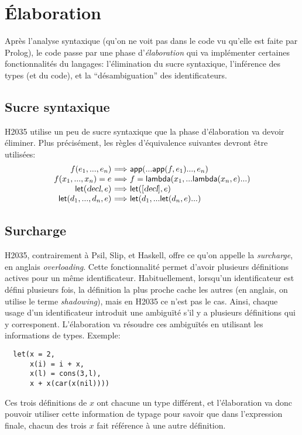 \documentclass{article}
\newcommand \kw [1] {\textsf{#1}}
\newcommand \id [1] {\textsl{#1}}
\renewcommand \: {\!:\!}
\begin{document}
\section{Élaboration}

Après l'analyse syntaxique (qu'on ne voit pas dans le code vu qu'elle est
faite par Prolog), le code passe par une phase d'\emph{élaboration} qui va
implémenter certaines fonctionnalités du langages: l'élimination du sucre
syntaxique, l'inférence des types (et du code), et la ``désambiguation''
des identificateurs.

\subsection{Sucre syntaxique}

H2035 utilise un peu de sucre syntaxique que la phase d'élaboration va
devoir éliminer.  Plus précisément, les règles d'équivalence suivantes
devront être utilisées:
\begin{displaymath}
  \begin{array}{r@{~\Longrightarrow~}l}
    f(e_1,...,e_n) & \kw{app}(...\kw{app}(f,e_1)...,e_n) \\
    f(x_1,...,x_n) = e & f = \kw{lambda}(x_1,...\kw{lambda}(x_n,e)...) \\
    \kw{let}(\id{decl}, e) & \kw{let}([\id{decl}], e) \\
    \kw{let}(d_1,...,d_n, e) & \kw{let}(d_1,...\kw{let}(d_n,e)...)
  \end{array}
\end{displaymath}

\subsection{Surcharge}

H2035, contrairement à Psil, Slip, et Haskell, offre ce qu'on appelle la
\emph{surcharge}, en anglais \emph{overloading}.  Cette fonctionnalité
permet d'avoir plusieurs définitions actives pour un même identificateur.
Habituellement, lorsqu'un identificateur est défini plusieurs fois, la
définition la plus proche cache les autres (en anglais, on utilise le terme
\emph{shadowing}), mais en H2035 ce n'est pas le cas.  Ainsi,
chaque usage d'un identificateur introduit une ambiguïté s'il y a plusieurs
définitions qui y corresponent.  L'élaboration va résoudre ces ambiguïtés
en utilisant les informations de types.  Exemple:
\begin{verbatim}
  let(x = 2,
      x(i) = i + x,
      x(l) = cons(3,l),
      x + x(car(x(nil))))
\end{verbatim}
Ces trois définitions de $x$ ont chacune un type différent, et l'élaboration
va donc pouvoir utiliser cette information de typage pour savoir que dans
l'expression finale, chacun des trois $x$ fait référence à une
autre définition.
\end{document}
